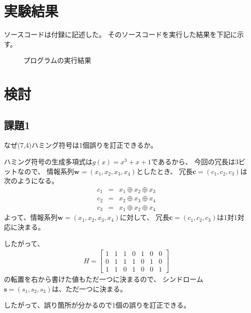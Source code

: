 \documentclass[12pt]{jarticle}
\begin{document}
\section{実験結果}

ソースコードは付録に記述した。
そのソースコードを実行した結果を下記に示す。

\begin{figure}[h]
    \begin{center}
    \end{center}
    \caption{プログラムの実行結果}
\end{figure}
\clearpage

\section{検討}
\subsection{課題1}
\begin{shadebox}
    なぜ(7,4)ハミング符号は1個誤りを訂正できるか。
\end{shadebox}
ハミング符号の生成多項式は$g(x)=x^3+x+1$であるから、
今回の冗長は3ビットなので、
情報系列$\boldsymbol{w}=(x_1,x_2,x_3,x_4)$としたとき、
冗長$\boldsymbol{c}=(c_1,c_2,c_3)$は次のようになる。
\begin{eqnarray}
    c_1&=&x_1 \oplus x_2 \oplus x_3 \nonumber\\
    c_2&=&x_2 \oplus x_3 \oplus x_4 \nonumber\\
    c_3&=&x_1 \oplus x_2 \oplus x_4 \nonumber
\end{eqnarray}
よって、情報系列$\boldsymbol{w}=(x_1,x_2,x_3,x_4)$に対して、
冗長$\boldsymbol{c}=(c_1,c_2,c_3)$は1対1対応に決まる。

したがって、
\begin{eqnarray*}
    H = \left[
        \begin{array}{rrrrrrr}
            1 & 1 & 1 & 0 & 1 & 0 & 0 \\
            0 & 1 & 1 & 1 & 0 & 1 & 0 \\
            1 & 1 & 0 & 1 & 0 & 0 & 1
        \end{array}
        \right]
\end{eqnarray*}
の転置を右から書けた値もただ一つに決まるので、
シンドローム$\boldsymbol{s}=(s_1,s_2,s_3)$は、ただ一つに決まる。

したがって、誤り箇所が分かるので1個の誤りを訂正できる。
\end{document}
